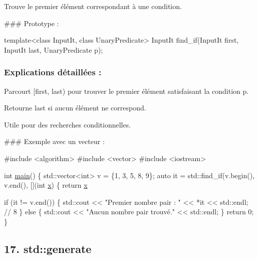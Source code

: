 Trouve le premier élément correspondant à une condition.

\#\#\# Prototype \+: 
\begin{DoxyCode}
\textcolor{keyword}{template}<\textcolor{keyword}{class} InputIt, \textcolor{keyword}{class} UnaryPredicate>
InputIt find\_if(InputIt first, InputIt last, UnaryPredicate p);
\end{DoxyCode}


\subsubsection*{Explications détaillées \+:}


\begin{DoxyItemize}
\item Parcourt {\ttfamily \mbox{[}first, last)} pour trouver le premier élément satisfaisant la condition {\ttfamily p}.
\item Retourne {\ttfamily last} si aucun élément ne correspond.
\item Utile pour des recherches conditionnelles.
\end{DoxyItemize}

\#\#\# Exemple avec un vecteur \+: 
\begin{DoxyCode}
\textcolor{preprocessor}{#include <algorithm>}
\textcolor{preprocessor}{#include <vector>}
\textcolor{preprocessor}{#include <iostream>}

\textcolor{keywordtype}{int} \hyperlink{htop_8c_a3c04138a5bfe5d72780bb7e82a18e627}{main}() \{
    std::vector<int> v = \{1, 3, 5, 8, 9\};
    \textcolor{keyword}{auto} it = std::find\_if(v.begin(), v.end(), [](\textcolor{keywordtype}{int} \hyperlink{addition_8c_a6150e0515f7202e2fb518f7206ed97dc}{x}) \{ \textcolor{keywordflow}{return} \hyperlink{addition_8c_a6150e0515f7202e2fb518f7206ed97dc}{x} %

    \textcolor{keywordflow}{if} (it != v.end()) \{
        std::cout << \textcolor{stringliteral}{"Premier nombre pair : "} << *it << std::endl; \textcolor{comment}{// 8}
    \} \textcolor{keywordflow}{else} \{
        std::cout << \textcolor{stringliteral}{"Aucun nombre pair trouvé."} << std::endl;
    \}
    \textcolor{keywordflow}{return} 0;
\}
\end{DoxyCode}
 



\subsection*{17. {\bfseries std\+::generate}}

